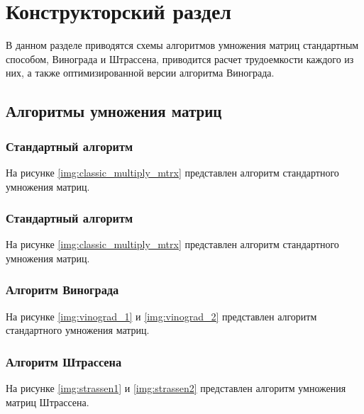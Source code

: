 \chapter{Конструкторский раздел}
В данном разделе приводятся схемы алгоритмов умножения матриц стандартным способом, Винограда и Штрассена, приводится расчет трудоемкости каждого из них, а также оптимизированной версии алгоритма Винограда.
\section{Алгоритмы умножения матриц}
\label{section:shemas_algo}
\subsection{Стандартный алгоритм}
На рисунке \ref{img:classic_multiply_mtrx} представлен алгоритм стандартного умножения матриц. 

\subsection{Стандартный алгоритм}
На рисунке \ref{img:classic_multiply_mtrx} представлен алгоритм стандартного умножения матриц. 

\newpage
\subsection{Алгоритм Винограда}
На рисунке \ref{img:vinograd_1} и \ref{img:vinograd_2} представлен алгоритм стандартного умножения матриц. 


\subsection{Алгоритм Штрассена}
На рисунке \ref{img:strassen1} и \ref{img:strassen2} представлен алгоритм умножения матриц Штрассена. 


